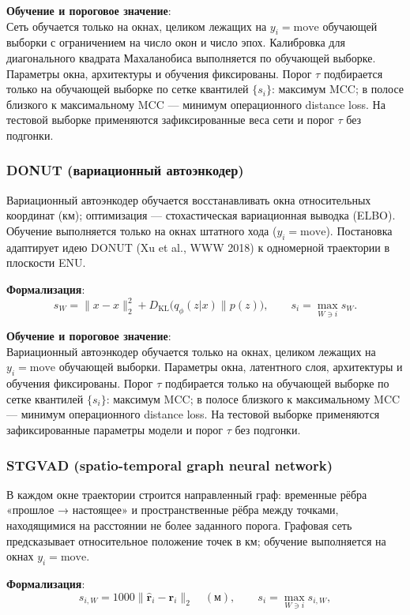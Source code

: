 \documentclass[a4paper,12pt]{report}
\begin{document}
	\textbf{Обучение и пороговое значение}:\\
	Сеть обучается только на окнах, целиком лежащих на $y_i=\mathrm{move}$ обучающей выборки с ограничением на число окон и число эпох. Калибровка для диагонального квадрата Махаланобиса выполняется по обучающей выборке. Параметры окна, архитектуры и обучения фиксированы. Порог $\tau$ подбирается только на обучающей выборке по сетке квантилей $\{s_i\}$: максимум MCC; в полосе близкого к максимальному MCC --- минимум операционного distance loss. На тестовой выборке применяются зафиксированные веса сети и порог $\tau$ без подгонки.

	\subsubsection{DONUT (вариационный автоэнкодер)}
	Вариационный автоэнкодер обучается восстанавливать окна относительных координат (км); оптимизация --- стохастическая вариационная выводка (ELBO). Обучение выполняется только на окнах штатного хода ($y_i=\mathrm{move}$). Постановка адаптирует идею DONUT (Xu et al., WWW 2018) к одномерной траектории в плоскости ENU.

	\textbf{Формализация}:\\
	$$s_W=\|x-\hat x\|_2^2 + D_{\mathrm{KL}}\bigl(q_\phi(z|x)\|p(z)\bigr), \qquad s_i=\max_{W\ni i}s_W.$$

	\textbf{Обучение и пороговое значение}:\\
	Вариационный автоэнкодер обучается только на окнах, целиком лежащих на $y_i=\mathrm{move}$ обучающей выборки. Параметры окна, латентного слоя, архитектуры и обучения фиксированы. Порог $\tau$ подбирается только на обучающей выборке по сетке квантилей $\{s_i\}$: максимум MCC; в полосе близкого к максимальному MCC — минимум операционного distance loss. На тестовой выборке применяются зафиксированные параметры модели и порог $\tau$ без подгонки.

	\subsubsection{STGVAD (spatio-temporal graph neural network)}
	В каждом окне траектории строится направленный граф: временные рёбра «прошлое → настоящее» и пространственные рёбра между точками, находящимися на расстоянии не более заданного порога. Графовая сеть предсказывает относительное положение точек в км; обучение выполняется на окнах $y_i=\mathrm{move}$.

	\textbf{Формализация}:\\
	$$s_{i,W}=1000\|\hat{\mathbf{r}}_i-\mathbf{r}_i\|_2 \quad (\text{м}), \qquad s_i=\max_{W\ni i} s_{i,W},$$
\end{document}
